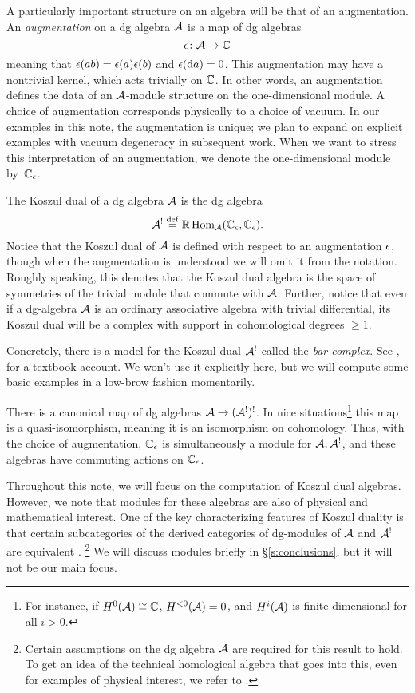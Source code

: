 \documentclass[11pt]{amsart}
\begin{document}
A particularly important structure on an algebra will be that of an augmentation. 
An {\em augmentation} on a dg algebra $\mathcal A$ is a map of dg algebras 
\[
\epsilon \colon \mathcal A \to \mathbb C 
\]
meaning that $\epsilon (a b) = \epsilon(a) \epsilon(b)$ and $\epsilon ({\rm d} a) = 0$. This augmentation may have a nontrivial kernel, which acts trivially on $\mathbb C$. 
In other words, an augmentation defines the data of an $\mathcal A$-module structure on the one-dimensional module. A choice of augmentation corresponds physically to a choice of vacuum. In our examples in this note, the augmentation is unique; we plan to expand on explicit examples with vacuum degeneracy in subsequent work.
When we want to stress this interpretation of an augmentation, we denote the one-dimensional module by~$\mathbb C_\epsilon$.

The Koszul dual of a dg algebra $\mathcal A$ is the dg algebra
\[
\mathcal A^! \overset{\rm def}{=} \mathbb{R}\operatorname{Hom}_\mathcal A(\mathbb C_\epsilon,\mathbb C_\epsilon) .
\] 
Notice that the Koszul dual of $\mathcal A$ is defined with respect to an augmentation $\epsilon$, though when the augmentation is understood we will omit it from the notation. Roughly speaking, this denotes that the Koszul dual algebra is the space of symmetries of the trivial module that commute with $\mathcal A$. Further, notice that even if a dg-algebra $\mathcal A$ is an ordinary associative algebra with trivial differential, its Koszul dual will be a complex with support in cohomological degrees $\geq 1$.

Concretely, there is a model for the Koszul dual $\mathcal A^!$ called the {\em bar complex}.
See \cite{Weibel}, for a textbook account. 
We won't use it explicitly here, but we will compute some basic examples in a low-brow fashion momentarily. 

There is a canonical map of dg algebras $\mathcal A \to (\mathcal A^!)^!$. 
In nice situations\footnote{For instance, if $H^0 (\mathcal A) \cong \mathbb C$, $H^{<0} (\mathcal A) = 0$, and $H^i(\mathcal A)$ is finite-dimensional for all $i > 0$.} 
this map is a quasi-isomorphism, meaning it is an isomorphism on cohomology. 
Thus, with the choice of augmentation, $\mathbb C_\epsilon$ is simultaneously a module for $\mathcal A, \mathcal A^!$, and these algebras have commuting actions on $\mathbb C_\epsilon$.

Throughout this note, we will focus on the computation of Koszul dual algebras. 
However, we note that modules for these algebras are also of physical and mathematical interest. 
One of the key characterizing features of Koszul duality is that certain subcategories of the derived categories of dg-modules of $\mathcal A$ and $\mathcal A^!$ are equivalent \cite{BGG, BGSch, BGSoerg, Pos}. \footnote{Certain assumptions on the dg algebra $\mathcal A$ are required for this result to hold. 
To get an idea of the technical homological algebra that goes into this, even for examples of physical interest, we refer to \cite[Section 8]{CYangian}. } 
We will discuss modules briefly in \S \ref{s:conclusions}, but it will not be our main focus. 
\end{document}
